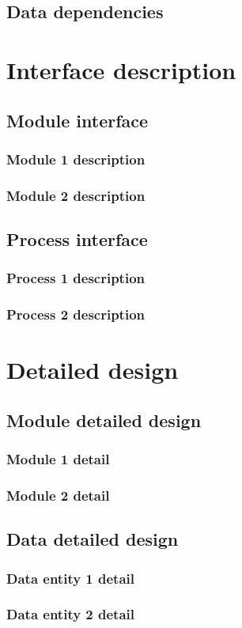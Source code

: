 \documentclass[12pt]{article}
\begin{document}
\subsection{Data dependencies}

\section{Interface description}
\subsection{Module interface}
\subsubsection{Module 1 description}
\subsubsection{Module 2 description}
\subsection{Process interface}
\subsubsection{Process 1 description}
\subsubsection{Process 2 description}

\section{Detailed design}
\subsection{Module detailed design}
\subsubsection{Module 1 detail}
\subsubsection{Module 2 detail}
\subsection{Data detailed design}
\subsubsection{Data entity 1 detail}
\subsubsection{Data entity 2 detail}
\end{document}
